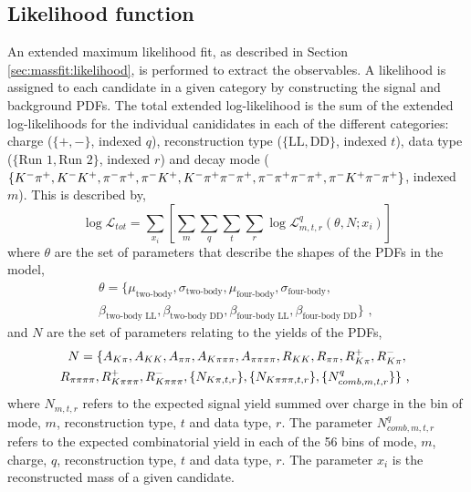 \subsection{Likelihood function}
\label{sec:cpfit:likelihood}

An extended maximum likelihood fit, as described in Section \ref{sec:massfit:likelihood}, is performed to extract the \CP observables. A likelihood is assigned to each candidate in a given category by constructing the signal and background PDFs. The total extended log-likelihood is the sum of the extended log-likelihoods for the individual canididates in each of the different categories: \B charge ($\{+,-\}$, indexed $q$), \KS reconstruction type ($\{\text{LL},\text{DD}\}$, indexed $t$), data type ($\{\text{Run 1},\text{Run 2}\}$, indexed $r$) and \Dz decay mode ($\{{{K}^-}{{\pi}^+},{{K}^-}{{K}^+},{{\pi}^-}{{\pi}^+},{{\pi}^-}{{K}^+},{{K}^-}{{\pi}^+}{{\pi}^-}{{\pi}^+},{{\pi}^-}{{\pi}^+}{{\pi}^-}{{\pi}^+},{{\pi}^-}{{K}^+}{{\pi}^-}{{\pi}^+}\}$, indexed $m$). This is described by,
\begin{equation}
\log\mathcal{L}_{tot} = \sum_{x_i} \left[ \sum_{m}\sum_{q}\sum_{t}\sum_{r} \log{\mathcal{L}}_{m,t,r}^q\left( \theta, N; x_i \right) \right]
\end{equation}
where $\theta$ are the set of parameters that describe the shapes of the PDFs in the model,
\begin{multline}
\theta = \{\mu_\text{two-body}, \sigma_\text{two-body}, \mu_\text{four-body}, \sigma_\text{four-body}, \\ \beta_\text{two-body LL}, \beta_\text{two-body DD}, \beta_\text{four-body LL}, \beta_\text{four-body DD}\} \text{ , }
\end{multline} 
and $N$ are the set of parameters relating to the yields of the PDFs, 
\begin{multline}
N = \{A_{K\pi}, A_{KK}, A_{\pi\pi}, A_{K\pi\pi\pi}, A_{\pi\pi\pi\pi}, R_{KK}, R_{\pi\pi}, R^+_{K\pi}, R^-_{K\pi}, \\ R_{\pi\pi\pi\pi}, R^+_{K\pi\pi\pi}, R^-_{K\pi\pi\pi}, \{N_{K\pi,t,r}\}, \{N_{K\pi\pi\pi,t,r}\}, \{N_{comb,m,t,r}^{q}\}\} \text{ , }
\end{multline}
where $N_{m,t,r}$ refers to the expected signal yield summed over charge in the bin of mode, $m$, \KS reconstruction type, $t$ and data type, $r$. The parameter $N_{comb,m,t,r}^q$ refers to the expected combinatorial yield in each of the 56 bins of mode, $m$, \B charge, $q$, \KS reconstruction type, $t$ and data type, $r$. The parameter $x_i$ is  the reconstructed mass of a given candidate.

